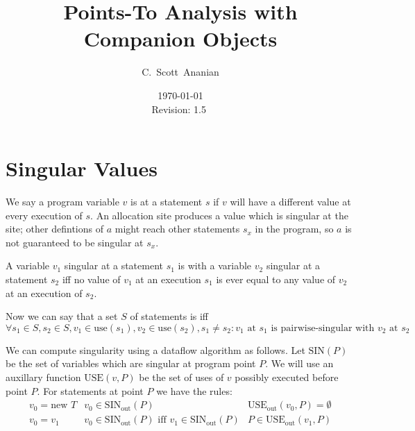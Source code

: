\documentclass[11pt,notitlepage]{article}
\author{C.~Scott~Ananian}
\title{Points-To Analysis with Companion Objects}
\date{\today \\ $ $Revision: 1.5 $ $}
\begin{document}

\maketitle
\section{Singular Values}

We say a program variable $v$ is  at a statement $s$
if $v$ will have a different value at every execution of $s$.  An
allocation site  produces a value which is singular
at the site; other defintions of $a$ might reach other statements
$s_x$ in the program, so $a$ is not guaranteed to be singular at $s_x$.

A variable $v_1$ singular at a statement $s_1$ is
 with a variable $v_2$ singular at a statement
$s_2$ iff no value of $v_1$ at an execution $s_1$ is ever equal to any
value of $v_2$ at an execution of $s_2$.

Now we can say that a set $S$ of statements is
 iff
\begin{displaymath}
\forall s_1 \in S, s_2 \in S, v_1 \in \text{use}(s_1), v_2 \in \text{use}(s_2),
  s_1 \neq s_2 :
v_1 \text{ at } s_1 \text{ is pairwise-singular with } v_2 \text{ at } s_2
\end{displaymath}


We can compute singularity using a dataflow algorithm as follows.
Let $\text{SIN}(P)$ be the set of variables which are singular
at program point $P$.  We will use an auxillary function
$\text{USE}(v, P)$ be the set of uses of $v$ possibly executed before
point $P$.  For statements at point $P$ we have the rules:
\begin{displaymath}
\begin{array}{lll}
v_0 = \text{new } T & v_0 \in \text{SIN}_{\text{out}}(P)
                    & \text{USE}_{\text{out}}(v_0, P) = \emptyset \\
v_0 = v_1 & v_0 \in \text{SIN}_{\text{out}}(P) \text{ iff }
            v_1 \in \text{SIN}_{\text{out}}(P)
          & P \in \text{USE}_{\text{out}}(v_1, P) \\

%
\end{array}
\end{displaymath}
\end{document}
